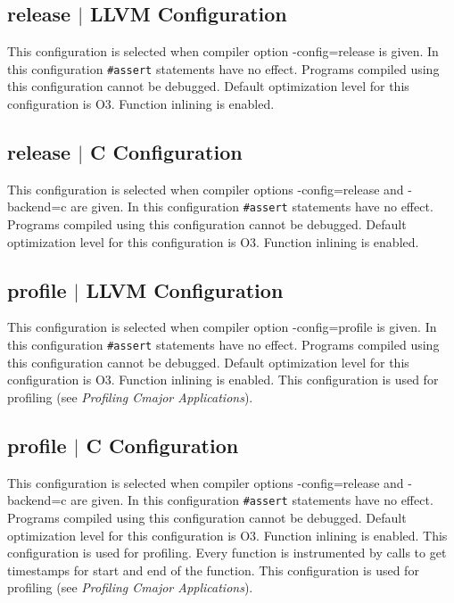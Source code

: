 \documentclass[oneside, a4paper, 11pt]{article}
\begin{document}
\subsection{release $|$ LLVM Configuration}

This configuration is selected when compiler option -config=release is given. In this configuration \verb|#assert| statements have no effect.
Programs compiled using this configuration cannot be debugged. Default optimization level for this configuration is O3. Function inlining is enabled.

\subsection{release $|$ C Configuration}

This configuration is selected when compiler options -config=release and -backend=c are given. In this configuration \verb|#assert| statements have no effect.
Programs compiled using this configuration cannot be debugged. Default optimization level for this configuration is O3. Function inlining is enabled.

\subsection{profile $|$ LLVM Configuration}

This configuration is selected when compiler option -config=profile is given. In this configuration \verb|#assert| statements have no effect.
Programs compiled using this configuration cannot be debugged. Default optimization level for this configuration is O3. Function inlining is enabled.
This configuration is used for profiling (see \emph{Profiling Cmajor Applications}).

\subsection{profile $|$ C Configuration}

This configuration is selected when compiler options -config=release and -backend=c are given. In this configuration \verb|#assert| statements have no effect.
Programs compiled using this configuration cannot be debugged. Default optimization level for this configuration is O3. Function inlining is enabled.
This configuration is used for profiling. Every function is instrumented by calls to get timestamps for start and end of the function.
This configuration is used for profiling (see \emph{Profiling Cmajor Applications}).
\end{document}
